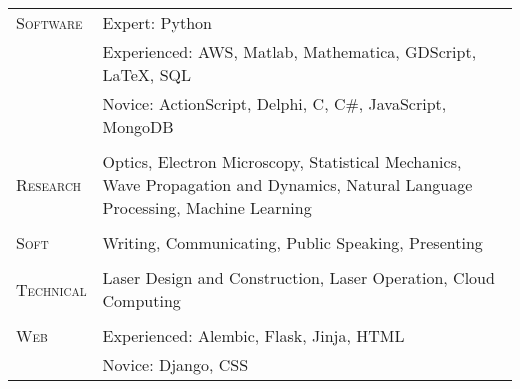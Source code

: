 \begin{supertabular}{p{1.8cm}|p{12cm}}
	\textsc{Software}  & Expert: Python \\
					   & Experienced: AWS, Matlab, Mathematica, GDScript, \LaTeX{}, SQL             \\
	                   & Novice: ActionScript, Delphi, C, C\#, JavaScript, MongoDB                  \\
	 \\
	\textsc{Research}  & Optics, Electron Microscopy, Statistical Mechanics, Wave Propagation and Dynamics, Natural Language Processing, Machine Learning \\
	 \\
	\textsc{Soft}	   & Writing, Communicating, Public Speaking, Presenting \\
	 \\
	\textsc{Technical} & Laser Design and Construction, Laser Operation, Cloud Computing \\
	 \\
	\textsc{Web}	   & Experienced: Alembic, Flask, Jinja, HTML \\
					   & Novice: Django, CSS \\
\end{supertabular}
